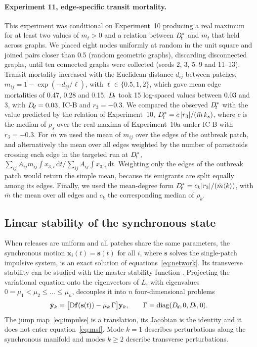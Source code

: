 \paragraph{Experiment 11, edge-specific transit mortality.} This experiment was conditional on Experiment~10 producing a real maximum for at least two values of $m_t > 0$ and a relation between $D_{\!t}^*$ and $m_t$ that held across graphs. We placed eight nodes uniformly at random in the unit square and joined pairs closer than 0.5 (random geometric graphs), discarding disconnected graphs, until ten connected graphs were collected (seeds 2, 3, 5--9 and 11--13). Transit mortality increased with the Euclidean distance $d_{ij}$ between patches, $m_{ij} = 1 - \exp(-d_{ij}/\ell)$, with $\ell \in \{0.5, 1, 2\}$, which gave mean edge mortalities of 0.47, 0.28 and 0.15. $D_{\!t}$ took 15 log-spaced values between 0.03 and 3, with $D_{\!d} = 0.03$, IC-B and $r_3 = -0.3$. We compared the observed $D_{\!t}^*$ with the value predicted by the relation of Experiment~10, $D_{\!t}^* = c\,|r_3|/(\bar m\,k_s)$, where $c$ is the median of $\rho_s$ over the real maxima of Experiment~10a under IC-B with $r_3 = -0.3$. For $\bar m$ we used the mean of $m_{ij}$ over the edges of the outbreak patch, and alternatively the mean over all edges weighted by the number of parasitoids crossing each edge in the targeted run at $D_{\!t}^*$, $\sum_{ij} A_{ij} m_{ij}\int x_{3,i}\,\mathrm{d}t \big/ \sum_{ij} A_{ij}\int x_{3,i}\,\mathrm{d}t$. Weighting only the edges of the outbreak patch would return the simple mean, because its emigrants are split equally among its edges. Finally, we used the mean-degree form $D_{\!t}^* = c_k|r_3|/(\bar m\langle k\rangle)$, with $\bar m$ the mean over all edges and $c_k$ the corresponding median of $\rho_k$.

\subsection{Linear stability of the synchronous state}
\label{sec:stability}

When releases are uniform and all patches share the same parameters, the synchronous motion $\mathbf{x}_i(t) = \mathbf{s}(t)$ for all $i$, where $\mathbf{s}$ solves the single-patch impulsive system, is an exact solution of equations~\eqref{eq:network}. Its transverse stability can be studied with the master stability function \citep{pecora1998,arenas2008}. Projecting the variational equation onto the eigenvectors of $L$, with eigenvalues $0 = \mu_1 < \mu_2 \le \dots \le \mu_n$, decouples it into $n$ four-dimensional problems
\begin{equation}
\dot{\mathbf{y}}_k = \bigl[\mathrm{D}\mathbf{f}(\mathbf{s}(t)) - \mu_k\,\Gamma\bigr]\mathbf{y}_k,\qquad \Gamma = \mathrm{diag}(D_{\!d}, 0, D_{\!t}, 0).
\label{eq:msf}
\end{equation}
The jump map~\eqref{eq:impulse} is a translation, its Jacobian is the identity and it does not enter equation~\eqref{eq:msf}. Mode $k=1$ describes perturbations along the synchronous manifold and modes $k\ge2$ describe transverse perturbations.

